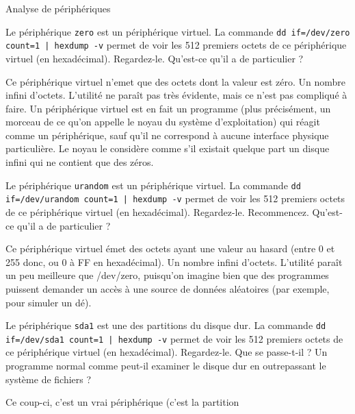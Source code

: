 \begin{exercice}
  \begin{exercicelet}{Analyse de périphériques}
    \begin{questions}
    \item Le périphérique \texttt{zero} est un périphérique virtuel. La
      commande \texttt{dd if=/dev/zero count=1 | hexdump -v} permet de
      voir les 512 premiers octets de ce périphérique virtuel (en
      hexadécimal). Regardez-le. Qu'est-ce qu'il a de particulier ?
      \begin{correction}
        Ce périphérique virtuel n'emet que des octets dont la valeur est
        zéro. Un nombre infini d'octets. L'utilité ne paraît pas très
        évidente, mais ce n'est pas compliqué à faire. Un périphérique
        virtuel est en fait un programme (plus précisément, un morceau
        de ce qu'on appelle le noyau du système d'exploitation) qui
        réagit comme un périphérique, sauf qu'il ne correspond à aucune
        interface physique particulière. Le noyau le considère comme
        s'il existait quelque part un disque infini qui ne contient que
        des zéros.
      \end{correction}
    \item Le périphérique \texttt{urandom} est un périphérique
      virtuel. La commande \texttt{dd if=/dev/urandom count=1 | hexdump
        -v} permet de voir les 512 premiers octets de ce périphérique
      virtuel (en hexadécimal). Regardez-le. Recommencez. Qu'est-ce
      qu'il a de particulier ?
      \begin{correction}
        Ce périphérique virtuel émet des octets ayant une valeur au
        hasard (entre 0 et 255 donc, ou 0 à FF en hexadécimal). Un
        nombre infini d'octets. L'utilité paraît un peu meilleure que
        /dev/zero, puisqu'on imagine bien que des programmes puissent
        demander un accès à une source de données aléatoires (par
        exemple, pour simuler un dé).
      \end{correction}
    \item Le périphérique \texttt{sda1} est une des partitions du disque
      dur. La commande \texttt{dd if=/dev/sda1 count=1 | hexdump -v}
      permet de voir les 512 premiers octets de ce périphérique virtuel
      (en hexadécimal). Regardez-le. Que se passe-t-il ? Un programme
      normal comme  peut-il examiner le disque dur en
      outrepassant le système de fichiers ?
      \begin{correction}
        Ce coup-ci, c'est un vrai périphérique (c'est la partition

\end{correction}
\end{questions}
\end{exercicelet}
\end{exercice}
